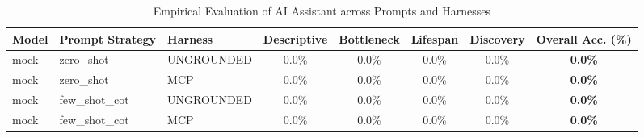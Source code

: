 \begin{table}[t]
\centering
\small
\caption{Empirical Evaluation of AI Assistant across Prompts and Harnesses}
\label{tab:assistant_eval}
\begin{tabular}{lllccccc}
\toprule
\textbf{Model} & \textbf{Prompt Strategy} & \textbf{Harness} & \textbf{Descriptive} & \textbf{Bottleneck} & \textbf{Lifespan} & \textbf{Discovery} & \textbf{Overall Acc. (\%)} \\
\midrule
mock & zero\_shot & UNGROUNDED & 0.0\% & 0.0\% & 0.0\% & 0.0\% & \textbf{0.0\%} \\
mock & zero\_shot & MCP & 0.0\% & 0.0\% & 0.0\% & 0.0\% & \textbf{0.0\%} \\
mock & few\_shot\_cot & UNGROUNDED & 0.0\% & 0.0\% & 0.0\% & 0.0\% & \textbf{0.0\%} \\
mock & few\_shot\_cot & MCP & 0.0\% & 0.0\% & 0.0\% & 0.0\% & \textbf{0.0\%} \\
\bottomrule
\end{tabular}
\end{table}
